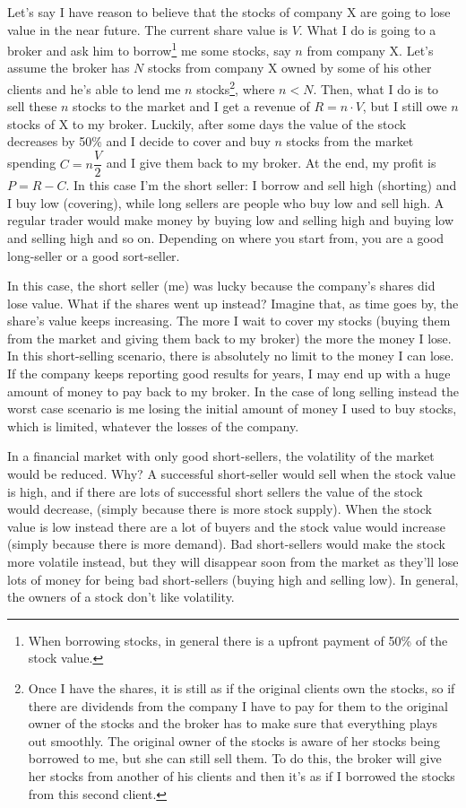 Let's say I have reason to believe that the stocks of company X are going to lose value in the near future. The current share value is $V$. What I do is going to a broker and ask him to borrow\footnote{When borrowing stocks, in general there is a upfront payment of 50\% of the stock value.} me some stocks, say $n$ from company X. Let's assume the broker has $N$ stocks from company X owned by some of his other clients and he's able to lend me $n$ stocks\footnote{Once I have the shares, it is still as if the original clients own the stocks, so if there are dividends from the company I have to pay for them to the original owner of the stocks and the broker has to make sure that everything plays out smoothly. The original owner of the stocks is aware of her stocks being borrowed to me, but she can still sell them. To do this, the broker will give her stocks from another of his clients and then it's as if I borrowed the stocks from this second client.}, where $n < N$. Then, what I do is to sell these $n$ stocks to the market and I get a revenue of $R = n \cdot V$, but I still owe $n$ stocks of X to my broker. Luckily, after some days the value of the stock decreases by 50\% and I decide to cover and buy $n$ stocks from the market spending $C = n\dfrac{V}{2}$ and I give them back to my broker. At the end, my profit is $P = R -C$. In this case I'm the short seller: I borrow and sell high (shorting) and I buy low (covering), while long sellers are people who buy low and sell high. A regular trader would make money by buying low and selling high and buying low and selling high and so on. Depending on where you start from, you are a good long-seller or a good sort-seller.

In this case, the short seller (me) was lucky because the company's shares did lose value. What if the shares went up instead? Imagine that, as time goes by, the share's value keeps increasing. The more I wait to cover my stocks (buying them from the market and giving them back to my broker) the more the money I lose. In this short-selling scenario, there is absolutely no limit to the money I can lose. If the company keeps reporting good results for years, I may end up with a huge amount of money to pay back to my broker. In the case of long selling instead the worst case scenario is me losing the initial amount of money I used to buy stocks, which is limited, whatever the losses of the company. 

In a financial market with only good short-sellers, the volatility of the market would be reduced. Why? A successful short-seller would sell when the stock value is high, and if there are lots of successful short sellers the value of the stock would decrease, (simply because there is more stock supply). When the stock value is low instead there are a lot of buyers and the stock value would increase (simply because there is more demand). Bad short-sellers would make the stock more volatile instead, but they will disappear soon from the market as they'll lose lots of money for being bad short-sellers (buying high and selling low). In general, the owners of a stock don't like volatility.

